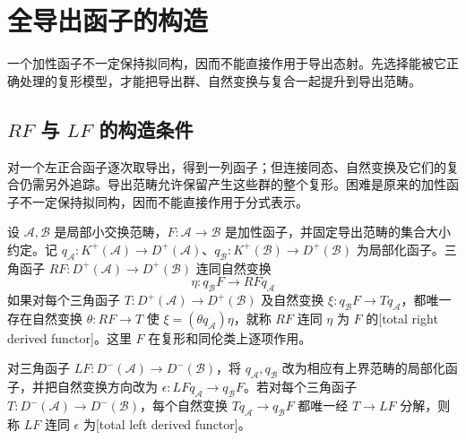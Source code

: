 
\section{全导出函子的构造}
\label{b4:sec:1801}

一个加性函子不一定保持拟同构，因而不能直接作用于导出态射。先选择能被它正确处理的复形模型，才能把导出群、自然变换与复合一起提升到导出范畴。

%
%

\subsection{\texorpdfstring{\(RF\) 与 \(LF\) 的构造条件}{RF 与 LF 的构造条件}}
\label{b4:subsec:1801:01}

对一个左正合函子逐次取导出，得到一列函子；但连接同态、自然变换及它们的复合仍需另外追踪。导出范畴允许保留产生这些群的整个复形。困难是原来的加性函子不一定保持拟同构，因而不能直接作用于分式表示。

\begin{definition}\label{b4:def:total-derived-functor}
	设 \(\mathcal A,\mathcal B\) 是局部小交换范畴，\(F:\mathcal A\to\mathcal B\) 是加性函子，并固定导出范畴的集合大小约定。记 \(q_{\mathcal A}:K^+(\mathcal A)\to D^+(\mathcal A)\)、\(q_{\mathcal B}:K^+(\mathcal B)\to D^+(\mathcal B)\) 为局部化函子。三角函子 \(RF:D^+(\mathcal A)\to D^+(\mathcal B)\) 连同自然变换
	\[
		\eta:q_{\mathcal B}F\longrightarrow RFq_{\mathcal A}
	\]
	如果对每个三角函子 \(T:D^+(\mathcal A)\to D^+(\mathcal B)\) 及自然变换 \(\xi:q_{\mathcal B}F\to Tq_{\mathcal A}\)，都唯一存在自然变换 \(\theta:RF\to T\) 使 \(\xi=(\theta q_{\mathcal A})\eta\)，就称 \(RF\) 连同 \(\eta\) 为 \(F\) 的[total right derived functor]。这里 \(F\) 在复形和同伦类上逐项作用。

	对三角函子 \(LF:D^-(\mathcal A)\to D^-(\mathcal B)\)，将 \(q_{\mathcal A},q_{\mathcal B}\) 改为相应有上界范畴的局部化函子，并把自然变换方向改为 \(\epsilon:LFq_{\mathcal A}\to q_{\mathcal B}F\)。若对每个三角函子 \(T:D^-(\mathcal A)\to D^-(\mathcal B)\)，每个自然变换 \(Tq_{\mathcal A}\to q_{\mathcal B}F\) 都唯一经 \(T\to LF\) 分解，则称 \(LF\) 连同 \(\epsilon\) 为[total left derived functor]。
\end{definition}

